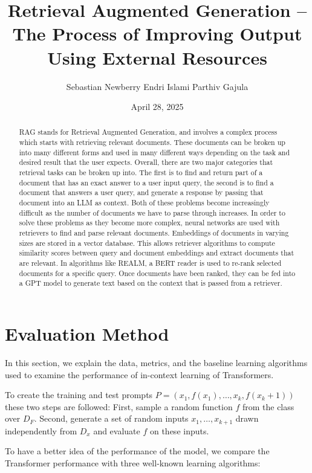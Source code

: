\documentclass[11pt]{article}
\title{Retrieval Augmented Generation – The Process of Improving Output Using External Resources}
\author{Sebastian Newberry \quad Endri Islami \quad Parthiv Gajula}
\date{April 28, 2025}
\begin{document}
\maketitle

\begin{abstract}
RAG stands for Retrieval Augmented Generation, and involves a complex process which starts with retrieving relevant documents. These documents can be broken up into many different forms and used in many different ways depending on the task and desired result that the user expects. Overall, there are two major categories that retrieval tasks can be broken up into. The first is to find and return part of a document that has an exact answer to a user input query, the second is to find a document that answers a user query, and generate a response by passing that document into an LLM as context. Both of these problems become increasingly difficult as the number of documents we have to parse through increases. In order to solve these problems as they become more complex, neural networks are used with retrievers to find and parse relevant documents. Embeddings of documents in varying sizes are stored in a vector database. This allows retriever algorithms to compute similarity scores between query and document embeddings and extract documents that are relevant. In algorithms like REALM, a BERT reader is used to re-rank selected documents for a specific query. Once documents have been ranked, they can be fed into a GPT model to generate text based on the context that is passed from a retriever.
\end{abstract}

\section{Evaluation Method}

In this section, we explain the data, metrics, and the baseline learning algorithms used to examine the performance of in-context learning of Transformers.

To create the training and test prompts $P = (x_1, f(x_1), \ldots, x_k, f(x_k+1))$ these two steps are followed: First, sample a random function $f$ from the class over $D_F$. Second, generate a set of random inputs $x_1, \ldots, x_{k+1}$ drawn independently from $D_x$ and evaluate $f$ on these inputs.

To have a better idea of the performance of the model, we compare the Transformer performance with three well-known learning algorithms:
\end{document}
